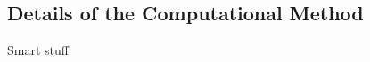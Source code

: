 \begin{appendices}
\makeatletter
{}

\chapter{Details of the Computational Method}

Smart stuff

\end{appendices}